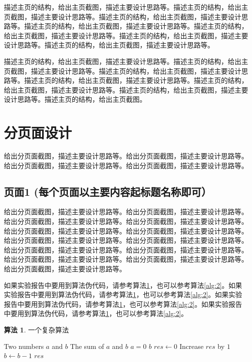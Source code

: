 \documentclass[supercite]{Experimental_Report}
\theoremstyle{definition}
\newtheorem{alg}{算法}[section]
\begin{document}
描述主页的结构，给出主页截图，描述主要设计思路等。描述主页的结构，给出主页截图，描述主要设计思路等。描述主页的结构，给出主页截图，描述主要设计思路等。描述主页的结构，给出主页截图，描述主要设计思路等。描述主页的结构，给出主页截图，描述主要设计思路等。描述主页的结构，给出主页截图，描述主要设计思路等。描述主页的结构，给出主页截图，描述主要设计思路等。

描述主页的结构，给出主页截图，描述主要设计思路等。描述主页的结构，给出主页截图，描述主要设计思路等。描述主页的结构，给出主页截图，描述主要设计思路等。描述主页的结构，给出主页截图，描述主要设计思路等。描述主页的结构，给出主页截图，描述主要设计思路等。描述主页的结构，给出主页截图，描述主要设计思路等。描述主页的结构，给出主页截图。

\newpage

\section{分页面设计}

给出分页面截图，描述主要设计思路等。给出分页面截图，描述主要设计思路等。给出分页面截图，描述主要设计思路等。给出分页面截图，描述主要设计思路等。

\subsection{页面1 (每个页面以主要内容起标题名称即可）}

给出分页面截图，描述主要设计思路等。给出分页面截图，描述主要设计思路等。给出分页面截图，描述主要设计思路等。给出分页面截图，描述主要设计思路等。给出分页面截图，描述主要设计思路等。给出分页面截图，描述主要设计思路等。给出分页面截图，描述主要设计思路等。给出分页面截图，描述主要设计思路等。给出分页面截图，描述主要设计思路等。给出分页面截图，描述主要设计思路等。给出分页面截图，描述主要设计思路等。给出分页面截图，描述主要设计思路等。给出分页面截图，描述主要设计思路等。

如果实验报告中要用到算法伪代码，请参考算法\ref{alg:1}，也可以参考算法\ref{alg:2}。如果实验报告中要用到算法伪代码，请参考算法\ref{alg:1}，也可以参考算法\ref{alg:2}。如果实验报告中要用到算法伪代码，请参考算法\ref{alg:1}，也可以参考算法\ref{alg:2}。如果实验报告中要用到算法伪代码，请参考算法\ref{alg:1}，也可以参考算法\ref{alg:2}。

\begin{shaded*}\begin{alg}{一个复杂算法}
		\label{alg:1}
		\begin{algorithmic}
			\Input Two numbers $a$ and $b$
			\Output The sum of $a$ and $b$
			\If $a = 0$
			\State \Return $b$
			\EndIf
			\State $res \gets 0$
			\State Increase $res$ by $1$
			\State $b \gets b - 1$
			\EndWhile
			\State \Return $res$
			\EndProcedure
		\end{algorithmic}
\end{alg}\end{shaded*}
\end{document}
